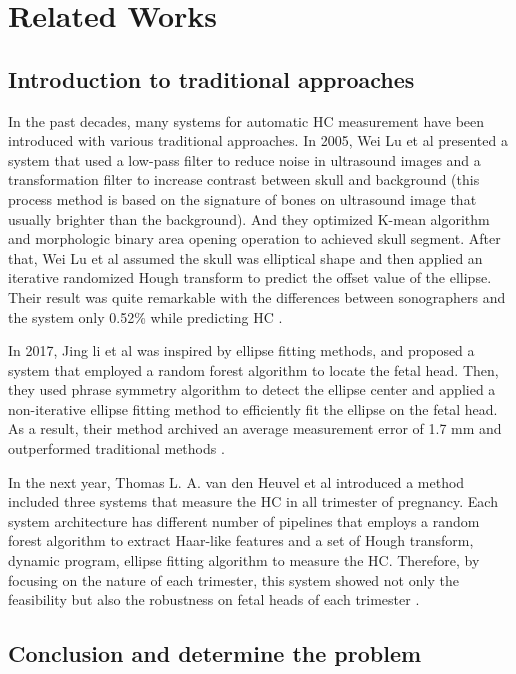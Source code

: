 \chapter{Related Works}
\section{Introduction to traditional approaches}
\noindent

	In the past decades, many systems for automatic HC measurement have been introduced with various traditional approaches. In 2005, Wei Lu et al presented a system that used a low-pass filter to reduce noise in ultrasound images and a transformation filter to increase contrast between skull and background (this process method is based on the signature of bones on ultrasound image that usually brighter than the background). And they optimized K-mean algorithm and morphologic binary area opening operation to achieved skull segment. After that, Wei Lu et al assumed the skull was elliptical shape and then applied an iterative randomized Hough transform to predict the offset value of the ellipse. Their result was quite remarkable with the differences between sonographers and the system only 0.52\% while predicting HC \cite{lu}.
	
	In 2017, Jing li et al was inspired by ellipse fitting methods, and proposed a system that employed a random forest algorithm to locate the fetal head. Then, they used phrase symmetry algorithm to detect the ellipse center and applied a non-iterative ellipse fitting method to efficiently fit the ellipse on the fetal head. As a result, their method archived an average measurement error of 1.7 mm and outperformed traditional methods \cite{li}.
	
	In the next year, Thomas L. A. van den Heuvel et al introduced a method included three systems that measure the HC in all trimester of pregnancy. Each system architecture has different number of pipelines that employs a random forest algorithm to extract Haar-like features and a set of Hough transform, dynamic program, ellipse fitting algorithm to measure the HC. Therefore, by focusing on the nature of each trimester, this system showed not only the feasibility but also the robustness on fetal heads of each trimester \cite{thomas}.
	

\section{Conclusion and determine the problem}
\noindent
	
